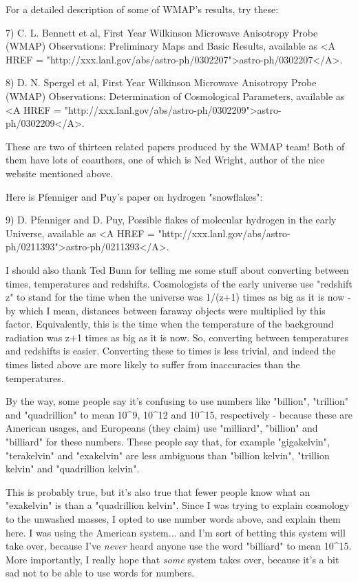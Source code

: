 For a detailed description of some of WMAP's results, try these:

7) C. L. Bennett et al, First Year Wilkinson Microwave Anisotropy
Probe (WMAP) Observations: Preliminary Maps and Basic Results, 
available as <A HREF = "http://xxx.lanl.gov/abs/astro-ph/0302207">astro-ph/0302207</A>.

8) D. N. Spergel et al, First Year Wilkinson Microwave Anisotropy
Probe (WMAP) Observations: Determination of Cosmological Parameters,
available as <A HREF = "http://xxx.lanl.gov/abs/astro-ph/0302209">astro-ph/0302209</A>.

These are two of thirteen related papers produced by the WMAP team!
Both of them have lots of coauthors, one of which is Ned Wright, author
of the nice website mentioned above.

Here is Pfenniger and Puy's paper on hydrogen "snowflakes":

9) D. Pfenniger and D. Puy, Possible flakes of molecular hydrogen in
the early Universe, available as <A HREF = "http://xxx.lanl.gov/abs/astro-ph/0211393">astro-ph/0211393</A>.

I should also thank Ted Bunn for telling me some stuff about
converting between times, temperatures and redshifts.  Cosmologists of
the early universe use "redshift z" to stand for the time when the
universe was 1/(z+1) times as big as it is now - by which I mean,
distances between faraway objects were multiplied by this factor.
Equivalently, this is the time when the temperature of the background
radiation was z+1 times as big as it is now.  So, converting between
temperatures and redshifts is easier.  Converting these to times is
less trivial, and indeed the times listed above are more likely to
suffer from inaccuracies than the temperatures.

By the way, some people say it's confusing to use numbers like
"billion", "trillion" and "quadrillion"
to mean 10^{9}, 10^{12} and 10^{15},
respectively - because these are American usages, and Europeans (they
claim) use "milliard", "billion" and
"billiard" for these numbers.  These people say that, for
example "gigakelvin", "terakelvin" and
"exakelvin" are less ambiguous than "billion
kelvin", "trillion kelvin" and "quadrillion
kelvin".

This is probably true, but it's also true that fewer people know
what an "exakelvin" is than a "quadrillion kelvin".  Since I was
trying to explain cosmology to the unwashed masses, I opted to 
use number words above, and explain them here.  I was using the
American system... and I'm sort of betting this system will take 
over, because I've \emph{never} 
heard anyone use the word "billiard" 
to mean 10^{15}.   More importantly, I really hope that \emph{some}
system takes over, because it's a bit sad not to be able to use 
words for numbers.

